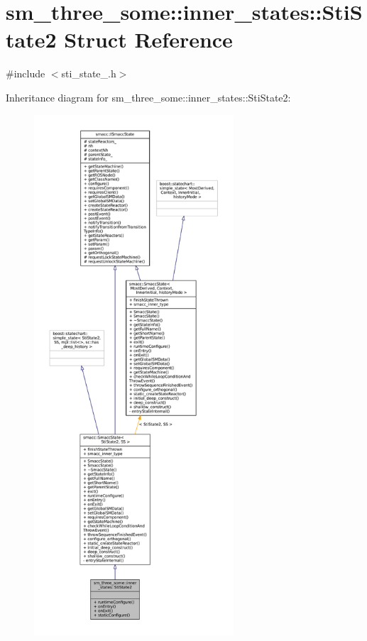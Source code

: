 \hypertarget{structsm__three__some_1_1inner__states_1_1StiState2}{}\section{sm\+\_\+three\+\_\+some\+:\+:inner\+\_\+states\+:\+:Sti\+State2 Struct Reference}
\label{structsm__three__some_1_1inner__states_1_1StiState2}


{\ttfamily \#include $<$sti\+\_\+state\+\_.\+h$>$}



Inheritance diagram for sm\+\_\+three\+\_\+some\+:\+:inner\+\_\+states\+:\+:Sti\+State2\+:
\nopagebreak
\begin{figure}[H]
\begin{center}
\leavevmode
\includegraphics[height=550pt]{structsm__three__some_1_1inner__states_1_1StiState2__inherit__graph}
\end{center}
\end{figure}


